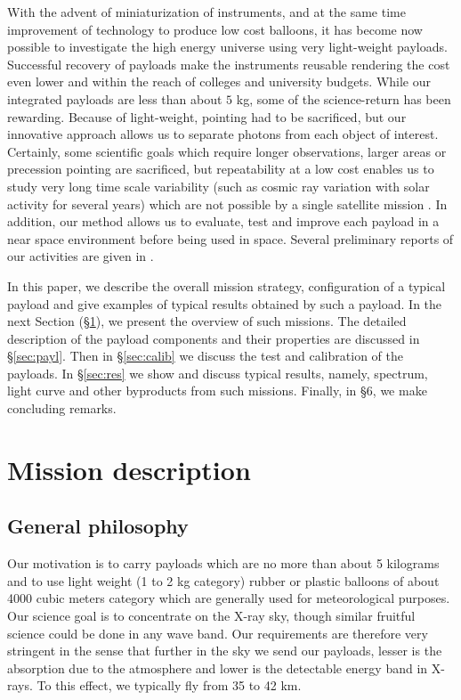With the advent of miniaturization of instruments, and at the same time 
improvement of technology to produce low cost balloons, it has become now possible to
investigate the high energy universe using very light-weight payloads.
Successful recovery of payloads make the instruments reusable rendering the cost even lower and within
the reach of colleges and university budgets. While our integrated payloads are
less than about $5$ kg, some of the science-return has been rewarding. Because of light-weight,
pointing had to be sacrificed, but our innovative approach allows us to separate photons
from each object of interest. Certainly, some scientific goals which require longer
observations, larger areas or precession pointing are sacrificed, but repeatability at a low cost 
enables us to study very long time scale variability (such as cosmic ray variation with solar activity
for several years) which are not possible by a single satellite mission \citep{sark17}. In addition, our method
allows us to evaluate, test and improve each payload in a near space environment before being used in space. 
Several preliminary reports of our activities are given in \citet{chak11, chak13, chak14, chak15}.

In this paper, we describe the overall mission strategy, configuration of a
typical payload and give examples of typical results obtained by such a payload.
In the next Section (\S \ref{sec:miss}), we present the overview of such 
missions. The detailed description of the payload components and their
properties are discussed in \S \ref{sec:payl}. Then in \S \ref{sec:calib} we 
discuss the test and calibration of the payloads. In \S \ref{sec:res}
we show and discuss typical results, namely, spectrum, light curve and other 
byproducts from such missions. Finally, in \S 6, we make concluding remarks.

\section{Mission description}
\label{sec:miss}

\subsection{General philosophy}
\label{ssec:phil}
Our motivation is to carry payloads which are no more than about 5 kilograms and to use
light weight (1 to 2 kg category) rubber or plastic balloons of about 4000 cubic meters
category which are generally used for meteorological purposes. Our science goal is
to concentrate on the X-ray sky, though similar fruitful science could be done in
any wave band. Our requirements are therefore very stringent in the sense that further in the
sky we send our payloads, lesser is the absorption due to the atmosphere and lower is the 
detectable energy band in X-rays. To this effect, we typically fly from 35 to 42 km.

